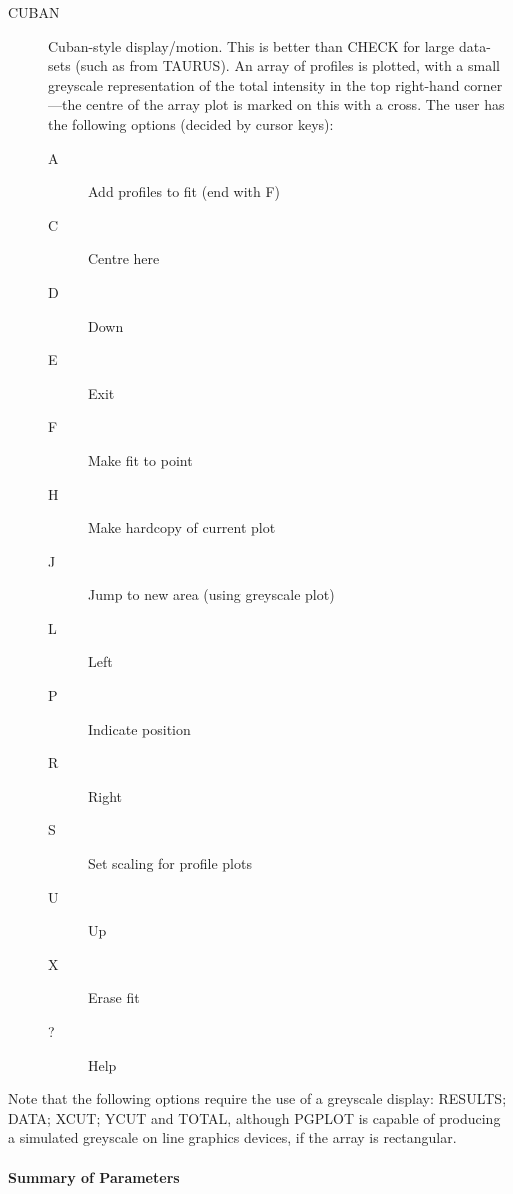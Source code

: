 \begin{description}
\item[CUBAN] Cuban-style display/motion.
This is better than CHECK for large data-sets (such as from TAURUS).
An array of profiles is plotted, with a small greyscale representation
of the total intensity in the top right-hand corner---the centre of the
array plot is marked on this with a cross.
The user has the following options (decided by cursor keys):
\begin{description}
\item[A] Add profiles to fit (end with F)
\item[C] Centre here
\item[D] Down
\item[E] Exit
\item[F] Make fit to point
\item[H] Make hardcopy of current plot
\item[J] Jump to new area (using greyscale plot)
\item[L] Left
\item[P] Indicate position
\item[R] Right
\item[S] Set scaling for profile plots
\item[U] Up
\item[X] Erase fit
\item[?] Help
\end{description}
\end{description}
Note that the following options require the use of a greyscale display:
RESULTS; DATA; XCUT; YCUT and TOTAL, although PGPLOT is capable of
producing a simulated greyscale on line graphics devices, if the array
is rectangular.

\paragraph{Summary of Parameters}

